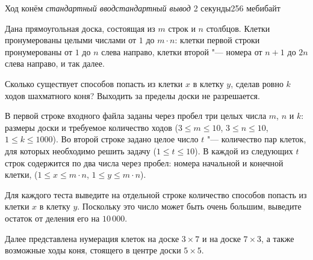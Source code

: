 \begin{problem}{Ход конём}
{\textsl{стандартный ввод}}{\textsl{стандартный вывод}}
{2 секунды}{256 мебибайт}{}

Дана прямоугольная доска, состоящая из $m$ строк и $n$ столбцов.
Клетки пронумерованы целыми числами от $1$ до $m \cdot n$: клетки
первой строки пронумерованы от $1$ до $n$ слева направо, клетки второй "---
номера от $n + 1$ до $2 n$ слева направо, и так далее.

Сколько существует способов попасть из клетки $x$ в клетку $y$,
сделав ровно $k$ ходов шахматного коня?
Выходить за пределы доски не разрешается.

\InputFile

В первой строке входного файла заданы через пробел три целых числа
$m$, $n$ и $k$: размеры доски и требуемое количество ходов
($3 \le m \le 10$, $3 \le n \le 10$, $1 \le k \le 1000$).
Во второй строке задано целое число $t$ "--- количество пар клеток,
для которых необходимо решить задачу ($1 \le t \le 10$).
В каждой из следующих $t$ строк содержится по два числа через пробел:
номера начальной и конечной клетки,
($1 \le x \le m \cdot n$, $1 \le y \le m \cdot n$).

\OutputFile

Для каждого теста выведите на отдельной строке количество способов
попасть из клетки $x$ в клетку $y$.
Поскольку это число может быть очень большим,
выведите остаток от деления его на $10\,000$.

\Examples

\begin{example}%
%
%
\end{example}

\Explanations

Далее представлена нумерация клеток на доске $3 \times 7$
и на доске $7 \times 3$, а также возможные ходы коня,
стоящего в центре доски $5 \times 5$.


\end{problem}
